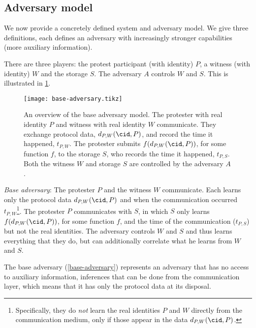 \subsection{Adversary model}%
\label{formal-adversary-model}

We now provide a concretely defined system and adversary model.
We give three definitions, each defines an adversary with increasingly stronger 
capabilities (\ie more auxiliary information).

There are three players: the protest participant (with identity) \(P\), a 
witness (with identity) \(W\) and the storage \(S\).
The adversary \(A\) controls \(W\) and \(S\).
This is illustrated in \cref{fig:base-adversary}.

\begin{figure}
  \centering
  \texttt{[image: base-adversary.tikz]}
  \caption{\label{fig:base-adversary}%
    An overview of the base adversary model.
    The protester with real identity \(P\) and witness with real identity \(W\) 
    communicate.
    They exchange protocol data, \(d_{P,W}(\cid, P)\), and record the time it 
    happened, \(t_{P,W}\).
    The protester submits \(f(d_{P,W}(\cid, P))\), for some function \(f\), to 
    the storage \(S\), who records the time it happened, \(t_{P,S}\).
    Both the witness \(W\) and storage \(S\) are controlled by the adversary 
    \(A\).
  }
\end{figure}

\begin{adversaries}
\item\label{base-adversary}
  \emph{Base adversary}:
  The protester \(P\) and the witness \(W\) communicate.
  Each learns only the protocol data \(d_{P,W}(\cid, P)\) and when the 
  communication occurred \(t_{P,W}\)\footnote{%
    Specifically, they do \emph{not} learn the real identities \(P\) and \(W\) 
    directly from the communication medium, only if those appear in the data 
    \(d_{P,W}(\cid, P)\).
  }.
  The protester \(P\) communicates with \(S\), in which \(S\) only learns 
  \(f(d_{P,W}(\cid, P))\), for some function \(f\), and the time of the 
  communication (\(t_{P,S}\)) but not the real identities.
  The adversary controls \(W\) and \(S\) and thus learns everything that they 
  do, but can additionally correlate what he learns from \(W\) and \(S\).
\end{adversaries}

The base adversary (\cref{base-adversary}) represents an adversary that has no 
access to auxiliary information, \eg inferences that can be done from the 
communication layer, which means that it has only the protocol data at its 
disposal.

